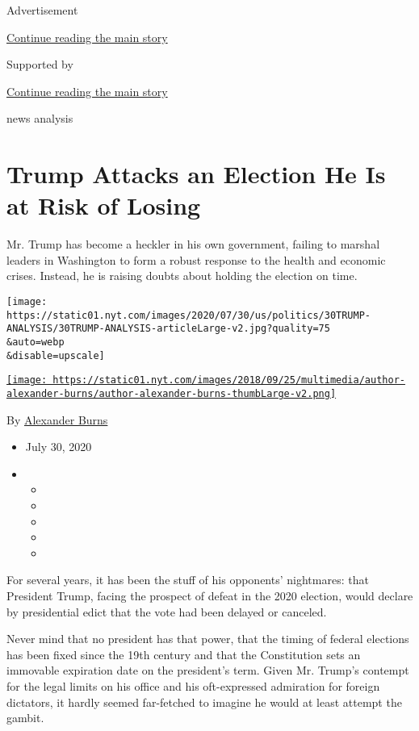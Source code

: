 Advertisement

\protect\hyperlink{after-top}{Continue reading the main story}

Supported by

\protect\hyperlink{after-sponsor}{Continue reading the main story}

news analysis

\hypertarget{trump-attacks-an-election-he-is-at-risk-of-losing}{%
\section{Trump Attacks an Election He Is at Risk of
Losing}\label{trump-attacks-an-election-he-is-at-risk-of-losing}}

Mr. Trump has become a heckler in his own government, failing to marshal
leaders in Washington to form a robust response to the health and
economic crises. Instead, he is raising doubts about holding the
election on time.

\texttt{[image: https://static01.nyt.com/images/2020/07/30/us/politics/30TRUMP-ANALYSIS/30TRUMP-ANALYSIS-articleLarge-v2.jpg?quality=75\\\&auto=webp\\\&disable=upscale]}

\href{https://www.nytimes.com/by/alexander-burns}{\texttt{[image: https://static01.nyt.com/images/2018/09/25/multimedia/author-alexander-burns/author-alexander-burns-thumbLarge-v2.png]}}

By \href{https://www.nytimes.com/by/alexander-burns}{Alexander Burns}

\begin{itemize}
\item
  July 30, 2020
\item
  \begin{itemize}
  \item
  \item
  \item
  \item
  \item
  \end{itemize}
\end{itemize}

For several years, it has been the stuff of his opponents' nightmares:
that President Trump, facing the prospect of defeat in the 2020
election, would declare by presidential edict that the vote had been
delayed or canceled.

Never mind that no president has that power, that the timing of federal
elections has been fixed since the 19th century and that the
Constitution sets an immovable expiration date on the president's term.
Given Mr. Trump's contempt for the legal limits on his office and his
oft-expressed admiration for foreign dictators, it hardly seemed
far-fetched to imagine he would at least attempt the gambit.

